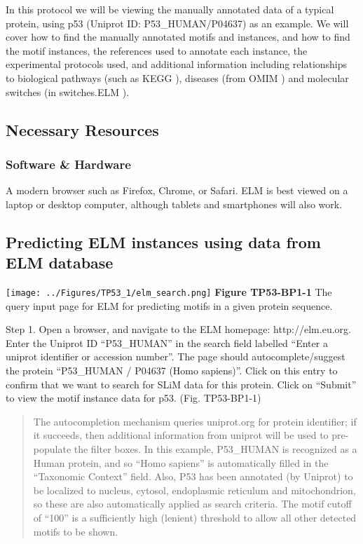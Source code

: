 In this protocol we will be viewing the manually annotated data of a
typical protein, using p53 (Uniprot ID: P53\_HUMAN/P04637) as an
example. We will cover how to find the manually annotated motifs and
instances, and how to find the motif instances, the references used to
annotate each instance, the experimental protocols used, and additional
information including relationships to biological pathways (such as KEGG
\cite{26476454}), diseases (from OMIM \cite{17357067}) and molecular
switches (in switches.ELM \cite{23550212}).

\subsection{Necessary Resources}\label{necessary-resources}

\subsubsection{Software \& Hardware}\label{software-hardware}

A modern browser such as Firefox, Chrome, or Safari. ELM is best viewed
on a laptop or desktop computer, although tablets and smartphones will
also work.

\subsection{Predicting ELM instances using data from ELM
database}\label{predicting-elm-instances-using-data-from-elm-database}

\texttt{[image: ../Figures/TP53\_1/elm\_search.png]} \textbf{Figure
TP53-BP1-1} The query input page for ELM for predicting motifs in a
given protein sequence.

Step 1. Open a browser, and navigate to the ELM homepage:
http://elm.eu.org. Enter the Uniprot ID ``P53\_HUMAN'' in the search
field labelled ``Enter a uniprot identifier or accession number''. The
page should autocomplete/suggest the protein ``P53\_HUMAN / P04637 (Homo
sapiens)''. Click on this entry to confirm that we want to search for
SLiM data for this protein. Click on ``Submit'' to view the motif
instance data for p53. (Fig. TP53-BP1-1)

\begin{quote}
The autocompletion mechanism queries uniprot.org for protein identifier;
if it succeeds, then additional information from uniprot will be used to
pre-populate the filter boxes. In this example, P53\_HUMAN is recognized
as a Human protein, and so ``Homo sapiens'' is automatically filled in
the ``Taxonomic Context'' field. Also, P53 has been annotated (by
Uniprot) to be localized to nucleus, cytosol, endoplasmic reticulum and
mitochondrion, so these are also automatically applied as search
criteria. The motif cutoff of ``100'' is a sufficiently high (lenient)
threshold to allow all other detected motifs to be shown.
\end{quote}

